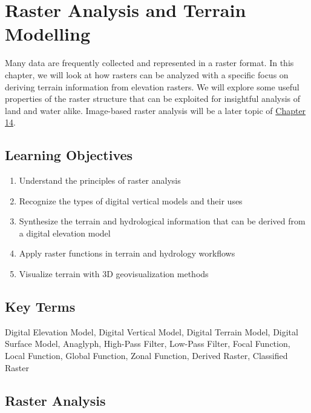 \documentclass[
]{book}
\providecommand{\tightlist}{%
  \setlength{\itemsep}{0pt}\setlength{\parskip}{0pt}}
\begin{document}
\hypertarget{raster-analysis-and-terrain-modelling}{%
\chapter{Raster Analysis and Terrain Modelling}\label{raster-analysis-and-terrain-modelling}}

Many data are frequently collected and represented in a raster format. In this chapter, we will look at how rasters can be analyzed with a specific focus on deriving terrain information from elevation rasters. We will explore some useful properties of the raster structure that can be exploited for insightful analysis of land and water alike. Image-based raster analysis will be a later topic of \href{https://ubc-geomatics-textbook.github.io/geomatics-textbook/image-analysis.html}{Chapter 14}.

\hypertarget{learning-objectives-8}{%
\section*{Learning Objectives}\label{learning-objectives-8}}

\begin{enumerate}
\def\labelenumi{\arabic{enumi}.}
\tightlist
\item
  Understand the principles of raster analysis
\item
  Recognize the types of digital vertical models and their uses
\item
  Synthesize the terrain and hydrological information that can be derived from a digital elevation model
\item
  Apply raster functions in terrain and hydrology workflows
\item
  Visualize terrain with 3D geovisualization methods
\end{enumerate}

\hypertarget{key-terms-8}{%
\section*{Key Terms}\label{key-terms-8}}

Digital Elevation Model, Digital Vertical Model, Digital Terrain Model, Digital Surface Model, Anaglyph, High-Pass Filter, Low-Pass Filter, Focal Function, Local Function, Global Function, Zonal Function, Derived Raster, Classified Raster

\hypertarget{raster-analysis}{%
\section{Raster Analysis}\label{raster-analysis}}
\end{document}

